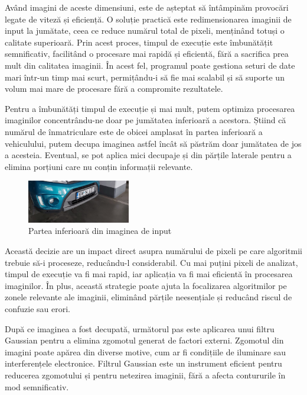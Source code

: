 \documentclass[a4paper,12pt]{report}
\begin{document}
Având imagini de aceste dimensiuni, este de așteptat să întâmpinăm provocări legate de viteză și eficiență. O soluție practică este redimensionarea imaginii de input la jumătate, ceea ce reduce numărul total de pixeli, menținând totuși o calitate superioară. Prin acest proces, timpul de execuție este îmbunătățit semnificativ, facilitând o procesare mai rapidă și eficientă, fără a sacrifica prea mult din calitatea imaginii. În acest fel, programul poate gestiona seturi de date mari într-un timp mai scurt, permițându-i să fie mai scalabil și să suporte un volum mai mare de procesare fără a compromite rezultatele.

Pentru a îmbunătăți timpul de execuție și mai mult, putem optimiza procesarea imaginilor concentrându-ne doar pe jumătatea inferioară a acestora. Știind că numărul de înmatriculare este de obicei amplasat în partea inferioară a vehiculului, putem decupa imaginea astfel încât să păstrăm doar jumătatea de jos a acesteia. Eventual, se pot aplica mici decupaje și din părțile laterale pentru a elimina porțiuni care nu conțin informații relevante.

\begin{figure}[h]
    \centering
    \includegraphics[width=0.4\textwidth]{images/crop.jpg}
    \caption{Partea inferioară din imaginea de input}
\end{figure}
\FloatBarrier

Această decizie are un impact direct asupra numărului de pixeli pe care algoritmii trebuie să-i proceseze, reducându-l considerabil. Cu mai puțini pixeli de analizat, timpul de execuție va fi mai rapid, iar aplicația va fi mai eficientă în procesarea imaginilor. În plus, această strategie poate ajuta la focalizarea algoritmilor pe zonele relevante ale imaginii, eliminând părțile neesențiale și reducând riscul de confuzie sau erori.

După ce imaginea a fost decupată, următorul pas este aplicarea unui filtru Gaussian pentru a elimina zgomotul generat de factori externi. Zgomotul din imagini poate apărea din diverse motive, cum ar fi condițiile de iluminare sau interferențele electronice. Filtrul Gaussian este un instrument eficient pentru reducerea zgomotului și pentru netezirea imaginii, fără a afecta contururile în mod semnificativ.
\end{document}
